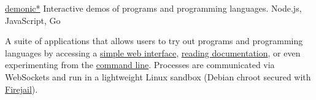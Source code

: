 \showoff
{\textcolor{my-blue}{\href{https://liambeckman.com/code/demonic}{demonic*}}}
{Interactive demos of programs and programming languages.}
{Node.js, JavaScript, Go}
{}

A suite of applications that allows users to try out programs and programming languages by accessing a \textcolor{my-blue}{\href{https://voyager-index.herokuapp.com}{simple web interface}}, \textcolor{my-blue}{\href{https://demo.liambeckman.com/docs-demonstration.html}{reading documentation}}, or even experimenting from the \textcolor{my-blue}{\href{https://github.com/lbeckman314/demo-cli.git}{command line}}. Processes are communicated via WebSockets and run in a lightweight Linux sandbox (Debian chroot secured with \textcolor{my-blue}{\href{https://firejail.wordpress.com/}{Firejail}}).

